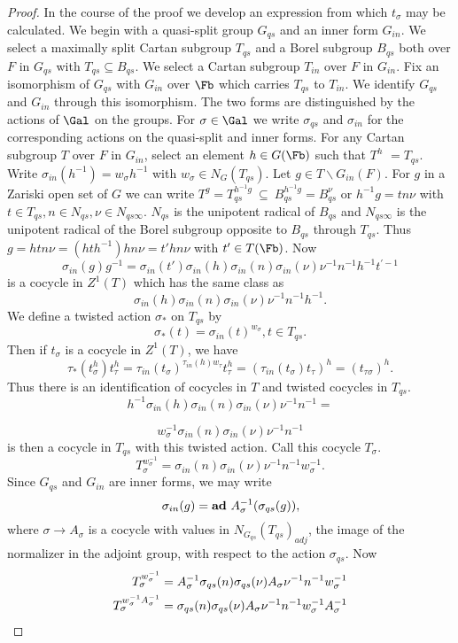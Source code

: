 \documentclass{memo-l}
\theoremstyle{definition}
\theoremstyle{remark}
\numberwithin{section}{chapter}
\numberwithin{equation}{chapter}
\begin{document}
\begin{proof}     In the course of the proof we develop an expression
from which $t_{{\sigma}}$ may be calculated.
 We begin with a quasi-split group $G_{qs}$ and an inner form $G_{in}$.
 We select a maximally split Cartan subgroup $T_{qs}$ and a Borel subgroup
$B_{qs}$ both over $F$ in $G_{qs}$ with $T_{qs} {\subseteq} {B_{qs}}$.
 We select a Cartan subgroup $T_{in}$ over $F$ in $G_{in}$.
 Fix an isomorphism of $G_{qs}$ with $G_{in}$ over $\Fb$  which
carries $T_{qs}$ to $T_{in}$.
 We identify $G_{qs}$ and $G_{in}$ through this isomorphism.
 The two forms are distinguished by the actions of $\Gal$ on the
groups.
 For ${\sigma} \in \Gal$ we write ${\sigma}_{qs}$ and
${\sigma}_{in}$ for the corresponding actions on the quasi-split and inner
forms.
  For any Cartan subgroup $T$ over $F$ in $G_{in}$, select an element $h \in
G(\Fb)$ such that $T^{h}$
$= T_{qs}$.
 Write ${\sigma}_{in}(h^{-1}) = w_{{\sigma}}h^{-1}$ with $w_{{\sigma}} \in
N_{G}(T_{qs})$.
 Let $g \in T\backslash G_{in}(F)$.
 For $g$ in a Zariski open set of $G$ we can write $T^g
= T_{qs}^{h^{-1}g}\ {\subseteq}\ B_{qs}^{h^{-1}g}  =
B_{qs}^\nu$  or $h^{-1}g = tn{\nu}$ with $t \in T_{qs},
n \in N_{qs}, {\nu} \in N_{qs{\infty}}$.
 $N_{qs}$ is the unipotent radical of $B_{qs}$ and $N_{qs{\infty}}$ is the
unipotent radical of the Borel subgroup opposite to $B_{qs}$ through $T_{qs}$.
 Thus $g = htn{\nu} = (hth^{-1})hn{\nu} = t'hn{\nu}$ with $t' \in
T(\Fb)$.
 Now
$$
\sigma_{in}(g)g^{-1} = {\sigma}_{in}(t'){\sigma}_{in}(h){\sigma}_{in}(n)
{\sigma}_{in}({\nu}){\nu}^{-1}n^{-1}h^{-1}t^{\prime-1}
$$
is a cocycle in $Z^{1}(T)$ which has the same class as
$$
{\sigma}_{in}(h){\sigma}_{in}(n){\sigma}_{in}({\nu}){\nu}^{-1}n^{-1}h^{-1} .
$$
We define a twisted action ${\sigma}_{*}$ on $T_{qs}$ by
$$
{\sigma}_{*}(t) = {\sigma}_{in}(t)^{w_{{\sigma}}}, t \in T_{qs} .
$$
Then if $t_{{\sigma}}$ is a cocycle in $Z^1(T)$, we have
$$
\tau_{*}(t_{{\sigma}}^{h})t_{{\tau}}^{h} =
{\tau}_{in}(t_{{\sigma}})^{\tau_{in}(h)w_{\tau}} t_{{\tau}}^{h} =
({\tau}_{in}(t_{{\sigma}})t_{{\tau}})^{h} = (t_{{\tau}{\sigma}})^{h}.
$$
Thus there is an identification of cocycles in $T$ and twisted cocycles in
$T_{qs}$.
$$
h^{-1}{\sigma}_{in}(h){\sigma}_{in}(n){\sigma}_{in}({\nu}){\nu}^{-1}n^{-1} =
$$

$$
w_{{\sigma}}^{-1}{\sigma}_{in}(n){\sigma}_{in}({\nu}){\nu}^{-1}n^{-1}
$$
is then a cocycle in $T_{qs}$ with this twisted action.
 Call this cocycle $T_{{\sigma}}$.
$$
T_{{\sigma}}^{w_\sigma^{-1}} =
{\sigma}_{in}(n){\sigma}_{in}({\nu}){\nu}^{-1}n^{-1}w_{{\sigma}}^{-1}.
$$
Since $G_{qs}$ and $G_{in}$ are inner forms, we may write
$$
{\sigma}_{in}(g) = {\bold {ad}}\ A_{{\sigma}}^{-1}({\sigma}_{qs}(g)),
$$
where ${\sigma} {\to} A_{{\sigma}}$ is a cocycle 
with values in $N_{G_{qs}}(T_{qs})_{adj}$, the image of the normalizer
in the adjoint group, 
with respect to the action ${\sigma}_{qs}$.
Now
$$
\aligned
T_{{\sigma}}^{w_\sigma^{-1}} &= A_{{\sigma}}^{-1}{\sigma}_{qs}(n)
{\sigma}_{qs}({\nu})A_{{\sigma}}{\nu}^{-1}n^{-1}w_{{\sigma}}^{-1} \\
T_\sigma^{w_\sigma^{-1}A_\sigma^{-1}} & = {\sigma}_{qs}(n)
{\sigma}_{qs}({\nu})A_{{\sigma}}{\nu}^{-1}n^{-1}w_{{\sigma}}^{-1}
A_{{\sigma}}^{-1}
\endaligned
$$


\end{proof}
\end{document}
